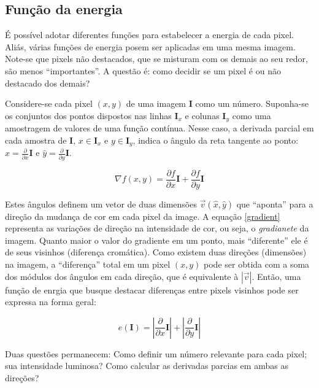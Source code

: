 \subsection{Função da energia}

É possível adotar diferentes funções para estabelecer a energia
de cada pixel.
Aliás, várias funções de energia posem ser aplicadas em uma mesma imagem.
Note-se que pixels não destacados, 
que se misturam com os demais ao seu redor,
são menos ``importantes''.
A questão é: como decidir se um pixel é ou não destacado dos demais?

Considere-se cada pixel $(x,y)$ de uma imagem $\mathbf{I}$ como um número.
Suponha-se os conjuntos dos pontos dispostos 
nas linhas $\mathbf{I}_x$ e colunas $\mathbf{I}_y$
como uma amostragem de valores de uma função contínua.
Nesse caso, a derivada parcial em cada amostra de  $\mathbf{I}$,
$x \in \mathbf{I}_x$ e
$y \in \mathbf{I}_y$,
indica o ângulo da reta tangente ao ponto:
$\hat{x} = \frac{\partial}{\partial x}\mathbf{I}$ e
$\hat{y} = \frac{\partial}{\partial y}\mathbf{I}$.

\begin{equation}
\label{gradient}
\nabla f(x,y) = \frac{\partial f}{\partial x}\mathbf{I} + 
                \frac{\partial f}{\partial y}\mathbf{I}
\end{equation}

Estes ângulos definem um vetor de duas dimensões 
$\vec{v}(\hat{x},\hat{y})$ que ``aponta'' para a direção 
da mudança de cor em cada pixel da image.
A equação \ref{gradient} representa as variações de direção na
intensidade de cor, ou seja, o {\it gradianete} da imagem.
Quanto maior o valor do gradiente em um ponto, 
mais ``diferente'' ele é de seus visinhos (diferença cromática).
Como existem duas direções (dimensões) na imagem, 
a ``diferença'' total em um pixel $(x,y)$ pode ser obtida com a soma 
dos módulos dos ângulos em cada direção,
que é equivalente à $|\vec{v}|$.
Então, uma função de enrgia que busque destacar diferenças entre
pixels visinhos pode ser expressa na forma geral:

\begin{equation}
\label{energy}
e(\mathbf{I}) = 
    |\frac{\partial}{\partial x}\mathbf{I}| + 
    |\frac{\partial}{\partial y}\mathbf{I}|
\end{equation}

Duas questões permanecem: 
Como definir um número relevante para cada pixel; sua intensidade luminosa?
Como calcular as derivadas parcias em ambas as direções?

